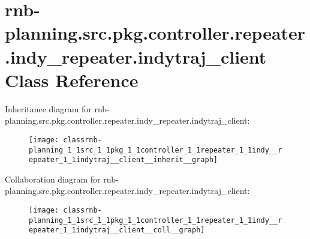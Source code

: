 \hypertarget{classrnb-planning_1_1src_1_1pkg_1_1controller_1_1repeater_1_1indy__repeater_1_1indytraj__client}{}\section{rnb-\/planning.src.\+pkg.\+controller.\+repeater.\+indy\+\_\+repeater.\+indytraj\+\_\+client Class Reference}
\label{classrnb-planning_1_1src_1_1pkg_1_1controller_1_1repeater_1_1indy__repeater_1_1indytraj__client}


Inheritance diagram for rnb-\/planning.src.\+pkg.\+controller.\+repeater.\+indy\+\_\+repeater.\+indytraj\+\_\+client\+:\nopagebreak
\begin{figure}[H]
\begin{center}
\leavevmode
\texttt{[image: classrnb-planning\_1\_1src\_1\_1pkg\_1\_1controller\_1\_1repeater\_1\_1indy\_\_repeater\_1\_1indytraj\_\_client\_\_inherit\_\_graph]}
\end{center}
\end{figure}


Collaboration diagram for rnb-\/planning.src.\+pkg.\+controller.\+repeater.\+indy\+\_\+repeater.\+indytraj\+\_\+client\+:\nopagebreak
\begin{figure}[H]
\begin{center}
\leavevmode
\texttt{[image: classrnb-planning\_1\_1src\_1\_1pkg\_1\_1controller\_1\_1repeater\_1\_1indy\_\_repeater\_1\_1indytraj\_\_client\_\_coll\_\_graph]}
\end{center}
\end{figure}
